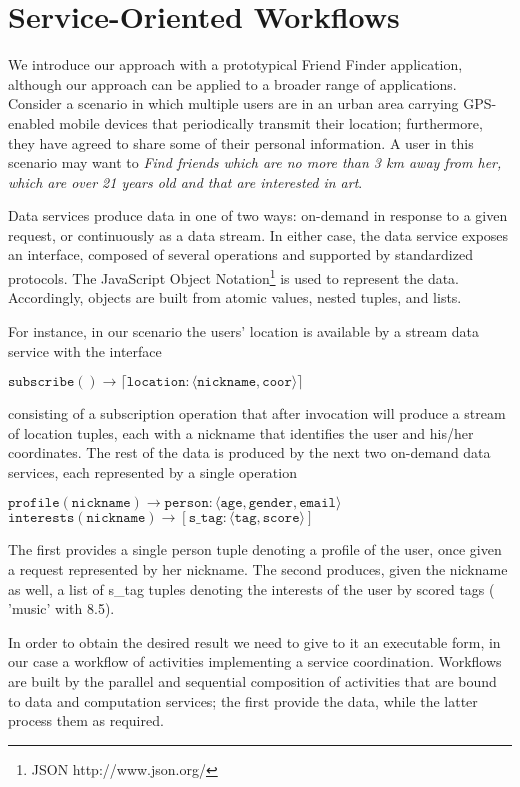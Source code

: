
\section{Service-Oriented Workflows}\label{sec:serviceOrientedWorkflows}

We introduce our approach with a prototypical Friend Finder application, although our approach can be applied to a broader range of applications. Consider a scenario in which multiple users are in an urban area carrying GPS-enabled mobile devices that periodically transmit their location; furthermore, they have agreed to share some of their personal information. A user in this scenario may want to \textit{Find friends which are no more than 3 km away from her, which are over 21 years old and that are interested in art}.
		
Data services produce data in one of two ways: on-demand in response to a given request, or continuously as a data stream. In either case, the data service exposes an interface, composed of several operations and supported by standardized protocols. The JavaScript Object Notation\footnote{JSON http://www.json.org/} is used to represent the data. Accordingly, objects are built from atomic values, nested tuples, and lists.
	
For instance, in our scenario the users' location is available by a stream data service with the interface
	
$\mathtt{subscribe() \rightarrow \lceil location:\langle nickname, coor\rangle\rceil}$
	
consisting of a subscription operation that after invocation will produce a stream of location tuples, each with a nickname that identifies the user and his/her coordinates. The rest of the data is produced by the next two on-demand data services, each represented by a single operation
	
$\mathtt{profile(nickname) \rightarrow person:\langle age, gender, email\rangle}$
\\
$\mathtt{interests(nickname) \rightarrow \left[s\_tag:\langle tag, score\rangle\right]}$
	
	
The first provides a single person tuple denoting a profile of the user, once given a request represented by her nickname. The second produces, given the nickname as well, a list of s\_tag tuples denoting the interests of the user by scored tags (\eg{} 'music' with 8.5).
	
In order to obtain the desired result we need to give to it an executable form, in our case a workflow of activities implementing a service coordination. Workflows are built by the parallel and sequential composition of activities that are bound to data and computation services; the first provide the data, while the latter process them as required.


